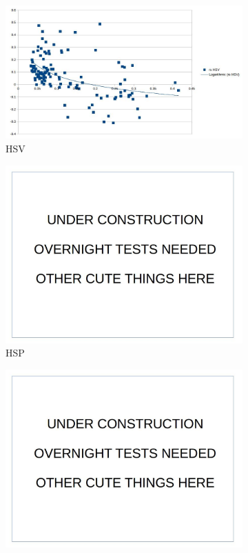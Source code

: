 \documentclass[12pt]{report}
\begin{document}
\begin{figure}
\centering
\begin{subfigure}{.49\linewidth}
  \includegraphics[width=1\linewidth]{figures/model_hsv.jpg}
  \caption{HSV}
\end{subfigure}
\hfill
\begin{subfigure}{.49\linewidth}
  \includegraphics[width=1\linewidth]{figures/placeholder.jpg}
  \caption{HSP}
\end{subfigure}
\hfill
\begin{subfigure}{.49\linewidth}
  \includegraphics[width=1\linewidth]{figures/placeholder.jpg}

\end{subfigure}
\end{figure}
\end{document}
